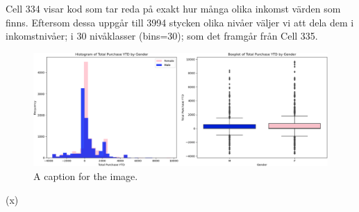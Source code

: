 \documentclass[]{article}
\begin{document}
Cell 334 visar kod som tar reda på exakt hur många olika inkomst värden som finns. Eftersom dessa uppgår till 3994 stycken olika nivåer väljer vi att dela dem i inkomstnivåer; i 30 nivåklasser (bins=30); som det framgår från Cell 335.
\begin{figure}[h]
    \centering
    \includegraphics[width=\textwidth]{img_boxplot.png}
    \caption{A caption for the image.}
\end{figure}
\if(x)
\fi
\end{document}
